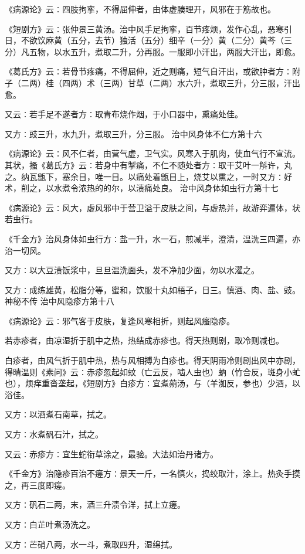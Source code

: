 \documentclass[a4paper,12pt,UTF8,twoside]{ctexbook}
\begin{document}
《病源论》云∶四肢拘挛，不得屈伸者，由体虚腠理开，风邪在于筋故也。

《短剧方》云∶张仲景三黄汤。治中风手足拘挛，百节疼烦，发作心乱，恶寒引日，不欲饮麻黄（五分，去节）独活（五分）细辛（一分）黄（二分）黄芩（三分）凡五物，以水五升，煮取二升，分再服。一服即小汗出，两服大汗出，即愈。

《葛氏方》云∶若骨节疼痛，不得屈伸，近之则痛，短气自汗出，或欲肿者方∶附子（二两）桂（四两）术（三两）甘草（二两）水六升，煮取三升，分三服，汗出愈。

又云∶若手足不遂者方∶取青布烧作烟，于小口器中，熏痛处佳。

又方∶豉三升，水九升，煮取三升，分三服。
治中风身体不仁方第十六

《病源论》云∶风不仁者，由营气虚，卫气实。风寒入于肌肉，使血气行不宣流。其状，搔《葛氏方》云∶若身中有掣痛，不仁不随处者方∶取干艾叶一斛许，丸之。纳瓦甑下，塞余目，唯一目。以痛处着甑目上，烧艾以熏之，一时又方∶好术，削之，以水煮令浓热的的尔，以渍痛处良。
治中风身体如虫行方第十七

《病源论》云∶风大，虚风邪中于营卫溢于皮肤之间，与虚热并，故游弈遍体，状若虫行。

《千金方》治风身体如虫行方∶盐一升，水一石，煎减半，澄清，温洗三四遍，亦治一切风。

又方∶以大豆渍饭浆中，旦旦温洗面头，发不净加少面，勿以水濯之。

又方∶成练雄黄，松脂分等，蜜和，饮服十丸如梧子，日三。慎酒、肉、盐、豉。神秘不传
治中风隐疹方第十八

《病源论》云∶邪气客于皮肤，复逢风寒相折，则起风瘙隐疹。

若赤疹者，由凉湿折于肌中之热，热结成赤疹也。得天热则剧，取冷则减也。

白疹者，由风气折于肌中热，热与风相搏为白疹也。得天阴雨冷则剧出风中亦剧，得晴温则《素问》云∶赤疹忽起如蚊（亡云反，啮人虫也）蚋（竹合反，斑身小虻也），烦痒重沓垄起，《短剧方》白疹方∶宜煮蒴汤，与（羊洳反，参也）少酒，以浴佳。

又方∶以酒煮石南草，拭之。

又方∶水煮矾石汁，拭之。

又云∶赤疹方∶宜生蛇衔草涂之，最验。大法如治丹诸方。

《千金方》治隐疹百治不瘥方∶景天一斤，一名慎火，捣绞取汁，涂上。热灸手摸之，再三度即瘥。

又方∶矾石二两，末，酒三升渍令洋，拭上立瘥。

又方∶白芷叶煮汤洗之。

又方∶芒硝八两，水一斗，煮取四升，湿绵拭。
\end{document}
